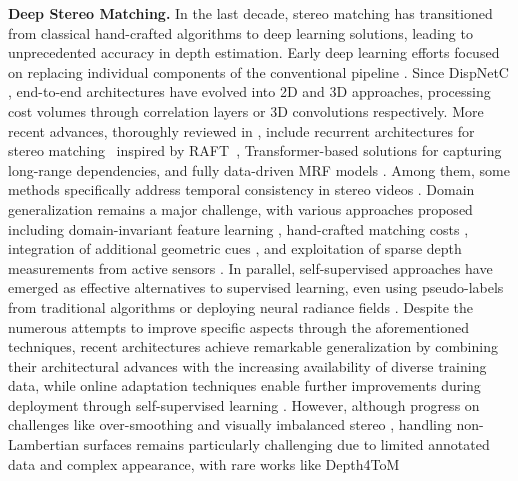 \documentclass[10pt,twocolumn,letterpaper]{article}
\begin{document}
    \textbf{Deep Stereo Matching.} In the last decade, stereo matching has transitioned from classical hand-crafted algorithms \cite{scharstein2002taxonomy} to deep learning solutions, leading to unprecedented accuracy in depth estimation. Early deep learning efforts focused on replacing individual components of the conventional pipeline \cite{zbontar2015computing,vzbontar2016stereo_MC-CNN,seki2017sgm, spyropoulos2014learning, tosi2024neural}. Since DispNetC \cite{mayer2016large}, end-to-end architectures have evolved into 2D \cite{yin2019hierarchical,liang2018learning_iResNet,song2019edgestereo, yin2019hierarchical} and 3D \cite{kendall2017end_GC-NET,yang2019hierarchical,zhang2019ga,bangunharcana2021correlate,Zeng_2023_ICCV,chang2018pyramid,guo2019group,shen2021cfnet,chen2023learning,shen2022pcw} approaches, processing cost volumes through correlation layers or 3D convolutions respectively. More recent advances, thoroughly reviewed in \cite{poggi2021synergies,laga2020survey,tosi2024survey}, include recurrent architectures for stereo matching~\cite{lipson2021raft,wang2024selective, chen2024mocha, zhao2023high, xu2023iterative, li2022practical, Jing_2023_ICCV, gong2024learning} inspired by RAFT~\cite{teed2020raft}, Transformer-based solutions \cite{Li_2021_ICCV_STTR, guo2022context_CEST, xu2023unifying, Su_2022_CVPR_Chitransformer, croco_v2,lou2023elfnet,zhang2024learning} for capturing long-range dependencies, and fully data-driven MRF models \cite{guan2024neural}. Among them, some methods specifically address temporal consistency in stereo videos \cite{Zhang2023TemporalStereo, Karaev_2023_CVPR, jing2024match, zeng2024temporally}. Domain generalization remains a major challenge, with various approaches proposed including domain-invariant feature learning \cite{zhang2019domaininvariant, Liu_2022_CVPR, Rao_2023_CVPR, Chuah_2022_CVPR, Song_2021_CVPR}, hand-crafted matching costs \cite{cai2020matchingspace, cheng2022revisiting}, integration of additional geometric cues \cite{aleotti2021neural, Pilzer_2023_WACV, tosi2024neural}, and exploitation of sparse depth measurements from active sensors \cite{poggi2019guided, bartolomei2023active, li2024stereo}. In parallel, self-supervised approaches \cite{godard2017unsupervised, Liu_2020_CVPR_Flow2Stereo} have emerged as effective alternatives to supervised learning, even using pseudo-labels from traditional algorithms \cite{tonioni2017unsupervised, aleotti2020reversing} or deploying neural radiance fields \cite{Tosi_2023_CVPR}. Despite the numerous attempts to improve specific aspects through the aforementioned techniques, recent architectures achieve remarkable generalization by combining their architectural advances with the increasing availability of diverse training data, while online adaptation techniques enable further improvements during deployment through self-supervised learning \cite{tonioni2019real, kim2022pointfix, poggi2021continual, Poggi_2024_CVPR}. However, although progress on challenges like over-smoothing \cite{Tosi2021CVPR_SMD,Xu_CVPR_2024_ADL} and visually imbalanced stereo \cite{liu2020visually,Chen_2022_CVPR,aleotti2021neural,tosi2024neural}, handling non-Lambertian surfaces remains particularly challenging due to limited annotated data and complex appearance, with rare works like Depth4ToM 
\end{document}
